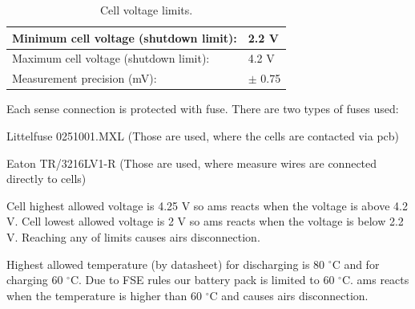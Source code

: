 \begin{table}[H]
	\centering
	\caption{Cell voltage limits.}
	\begin{tabu}{|X|X|}
		\hline
		Minimum cell voltage (shutdown limit): & 2.2 V \\
		\hline
		Maximum cell voltage (shutdown limit): & 4.2 V \\
		\hline
		Measurement precision (mV): & $\pm$ 0.75 \\
		\hline
	\end{tabu}%
	\label{tab:acc-limits}%
\end{table}%


Each sense connection is protected with fuse. There are two types of fuses used: 

\noindent Littelfuse 0251001.MXL (Those are used, where the cells are contacted via \gls{pcb})

\noindent Eaton TR/3216LV1-R (Those are used, where measure wires are connected directly to cells)

Cell highest allowed voltage is 4.25 V so \gls{ams} reacts when the voltage is above 4.2 V. Cell lowest allowed voltage is 2 V so \gls{ams} reacts when the voltage is below 2.2 V. Reaching any of limits causes \glspl{air} disconnection.

Highest allowed temperature (by datasheet) for discharging is 80 $^\circ$C and for charging 60 $^\circ$C. Due to FSE rules our battery pack is limited to 60 $^\circ$C. \gls{ams} reacts when the temperature is higher than 60 $^\circ$C and causes \glspl{air} disconnection.

